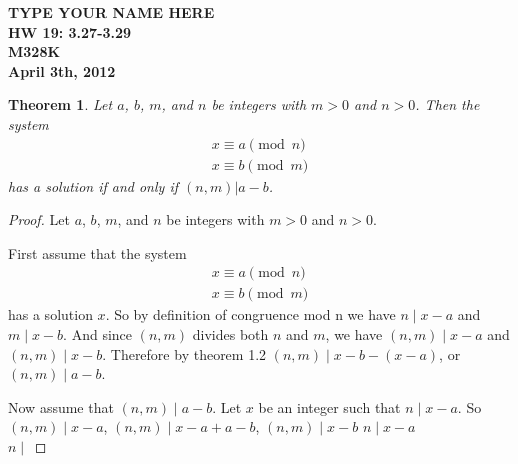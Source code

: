 \documentclass[12pt,leqno]{article}
\numberwithin{equation}{section}
\newtheorem{thm}{Theorem}[section]
\theoremstyle{definition}
\begin{document}
\thispagestyle{plain}
\begin{flushright}
\large{\textbf{TYPE YOUR NAME HERE \\
HW 19: 3.27-3.29\\
M328K \\
April 3th, 2012 \\}}
\end{flushright}

\markboth{}{} \setcounter{section}{0} \baselineskip=18pt

\setcounter{tocdepth}{4}



\setcounter{section}{3}

\setcounter{thm}{26}

\begin{thm}
Let $a$, $b$, $m$, and $n$ be integers with $m > 0$ and $n > 0$.
Then the system
\[ \begin{array}{l}
x \equiv a \pmod{n} \\
x \equiv b \pmod{m} \end{array} \] has a solution if and only if
$(n, m)| a - b$.
\end{thm}

\begin{proof}[Proof]
Let $a$, $b$, $m$, and $n$ be integers with $m > 0$ and $n > 0$.

First assume that the system 
\[ \begin{array}{l}
x \equiv a \pmod{n} \\
x \equiv b \pmod{m} \end{array} \] has a solution $x$.  So by definition of congruence mod n we have $n \mid x - a$ and $m \mid x - b$.  And since $(n, m)$ divides both $n$ and $m$, we have $(n, m) \mid x - a$ and $(n, m) \mid x - b$.  Therefore by theorem 1.2 $(n, m) \mid x - b - (x - a)$, or $(n, m) \mid a - b$.

Now assume that $(n, m) \mid a - b$.  Let $x$ be an integer such that $n \mid x - a$.  So $(n, m) \mid x - a$, $(n, m) \mid x - a + a - b$, $(n, m) \mid x - b$
$n \mid x - a$\\
$n \mid $








\end{proof}
\end{document}
